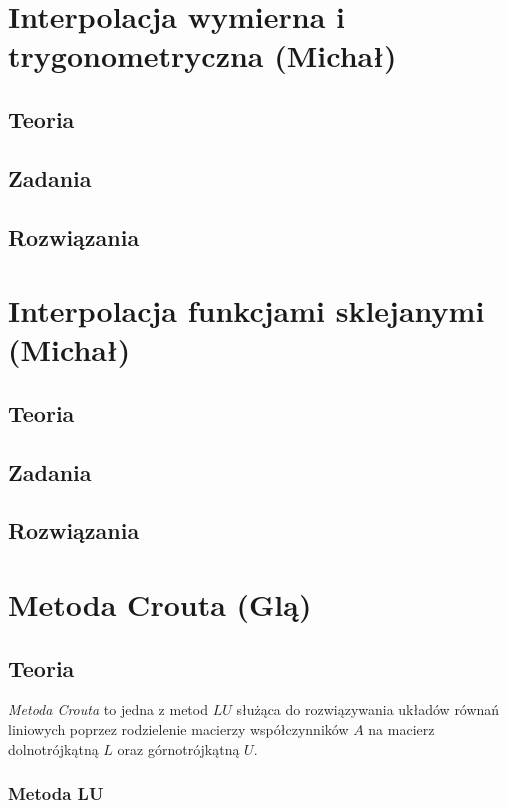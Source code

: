 \documentclass[a4paper]{article}
\begin{document}
\section{Interpolacja wymierna i trygonometryczna (Michał)}
\subsection{Teoria}

\subsection{Zadania}

\subsection{Rozwiązania}

\section{Interpolacja funkcjami sklejanymi (Michał)}
\subsection{Teoria}

\subsection{Zadania}

\subsection{Rozwiązania}



\section{Metoda Crouta (Glą)}
\subsection{Teoria}
\emph {Metoda Crouta} to jedna z metod $LU$ służąca do rozwiązywania układów równań liniowych poprzez rodzielenie macierzy współczynników $A$ na macierz dolnotrójkątną $L$ oraz górnotrójkątną $U$. 

\subsubsection*{Metoda LU}
\end{document}
